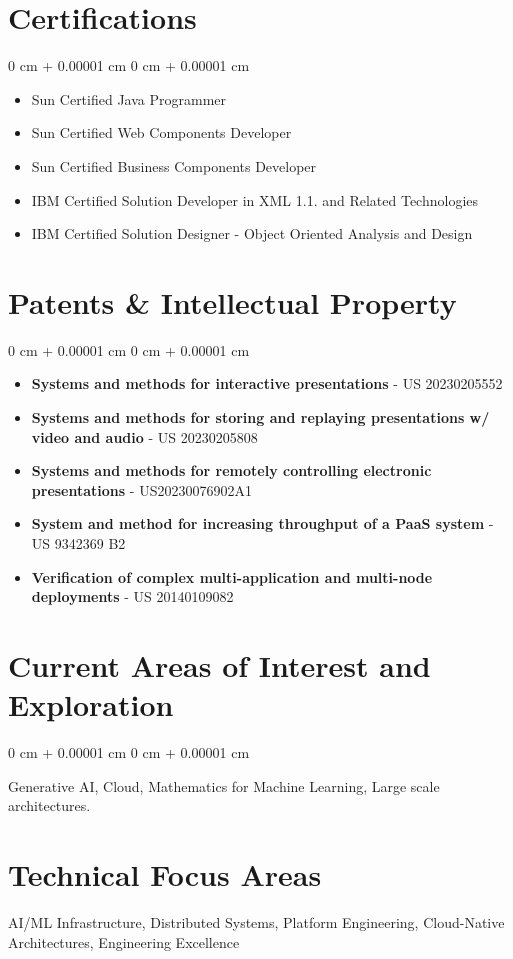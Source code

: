 \documentclass[10pt, letterpaper]{article}
\newenvironment{highlights}{
    \begin{itemize}[
        topsep=0.10 cm,
        parsep=0.10 cm,
        partopsep=0pt,
        itemsep=0pt,
        leftmargin=0 cm + 10pt
    ]
}{
    \end{itemize}
} %
\newenvironment{onecolentry}{
    \begin{adjustwidth}{
        0 cm + 0.00001 cm
    }{
        0 cm + 0.00001 cm
    }
}{
    \end{adjustwidth}
} %
\begin{document}
        \section{Certifications}
        \vspace{0.10 cm}
        \begin{onecolentry}
            \begin{highlights}
                \item Sun Certified Java Programmer
                \item Sun Certified Web Components Developer
                \item Sun Certified Business Components Developer
                \item IBM Certified Solution Developer in XML 1.1. and Related Technologies
                \item IBM Certified Solution Designer - Object Oriented Analysis and Design
            \end{highlights}
        \end{onecolentry}

        \section{Patents \& Intellectual Property}
        \vspace{0.10 cm}
        \begin{onecolentry}
            \begin{highlights}
                \item \textbf{Systems and methods for interactive presentations} - US 20230205552
                \item \textbf{Systems and methods for storing and replaying presentations w/ video and audio} - US 20230205808
                \item \textbf{Systems and methods for remotely controlling electronic presentations} - US20230076902A1
                \item \textbf{System and method for increasing throughput of a PaaS system} - US 9342369 B2
                \item \textbf{Verification of complex multi-application and multi-node deployments} - US 20140109082
            \end{highlights}
        \end{onecolentry}
        
        \section{Current Areas of Interest and Exploration}
        \vspace{0.10 cm}
        \begin{onecolentry}
            Generative AI, Cloud, Mathematics for Machine Learning, Large scale architectures.
        \end{onecolentry}
        
        \section{Technical Focus Areas}
        AI/ML Infrastructure, Distributed Systems, Platform Engineering, Cloud-Native Architectures, Engineering Excellence

        \vspace{0.10 cm}
\end{document}
